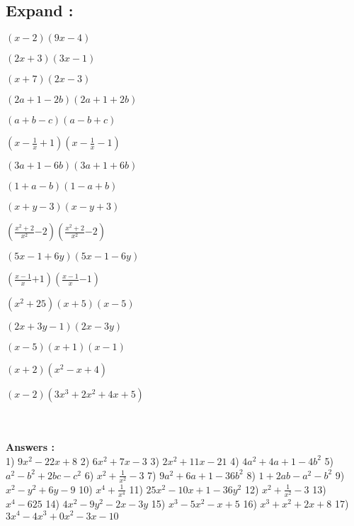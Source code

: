 \documentclass{article}
\begin{document}
\subsection{Expand :}
\begin{enumerate*}
	\item $(x-2)(9x-4)$ \item $(2x+3)(3x-1)$ \item $(x+7)(2x-3)$ \item $(2a+1-2b)(2a+1+2b)$ \item $(a+b-c)(a-b+c)$ \item $\left(x-\frac{1}{x}+1\right)\left(x-\frac{1}{x}-1\right)$ \item $(3a+1-6b)(3a+1+6b)$ \item $(1+a-b)(1-a+b)$ \item $(x+y-3)(x-y+3)$ \item $\left(\frac{x^2+2}{x^2}{-2}\right)\left(\frac{x^2+2}{x^2}{-2}\right)$ \item $(5x-1+6y)(5x-1-6y)$ \item $(\frac{x-1}{x}{+1})(\frac{x-1}{x}{-1})$ \item $(x^2 + 25)(x+5)(x-5)$ \item $(2x+3y-1)(2x-3y)$ \item $(x-5)(x+1)(x-1)$ \item $(x+2)\left(x^2-x+4\right)$ \item $(x-2)\left(3x^3+2x^2+4x+5\right)$
\end{enumerate*}\\\\
{\small \textbf{Answers :}}\\
{\footnotesize 1) $9x^{2}-22x+8$} {\footnotesize 2) $6x^{2}+7x-3$} {\footnotesize 3) $2x^{2}+11x-21$} {\footnotesize 4) $4a^{2}+4a+1-4b^{2}$} {\footnotesize 5) $a^{2}-b^{2}+2bc-c^{2}$} {\footnotesize 6) $x^{2}+\frac{1}{x^{2}}-3$} {\footnotesize 7) $9a^{2}+6a+1-36b^{2}$} {\footnotesize 8) $1+2ab-a^{2}-b^{2}$} {\footnotesize 9) $x^{2}-y^{2}+6y-9$} {\footnotesize 10) $x^{4}+\frac{1}{x^{4}}$} {\footnotesize 11) $25x^2 - 10x + 1-36y^2$} {\footnotesize 12) $x^{2}+\frac{1}{x^2}-3$} {\footnotesize 13) $x^{4}-625$} {\footnotesize 14) $4x^{2}-9y^{2}-2x-3y$} {\footnotesize 15) $x^{3}-5x^{2}-x+5$} {\footnotesize 16) $x^{3}+x^{2}+2x+8$} {\footnotesize 17) $3x^{4}-4x^{3}+0x^{2}-3x-10$}
\end{document}
